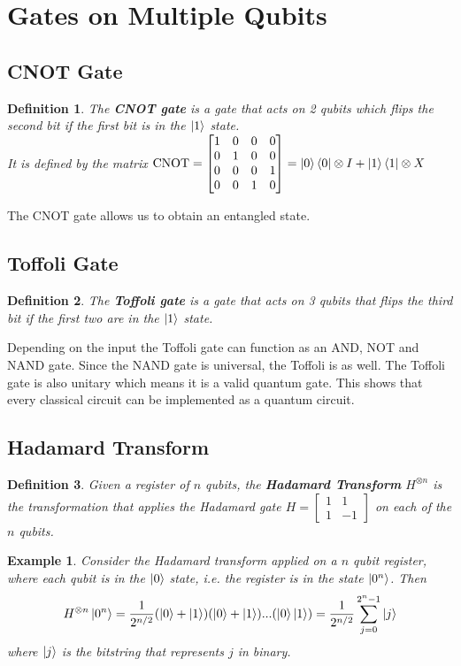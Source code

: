 \documentclass[12pt,twoside,fleqn]{report}
\theoremstyle{thmstyle}
\newtheorem{defn}{Definition}[chapter]
\newtheorem{eg}{Example}[chapter]
\begin{document}
\section{Gates on Multiple Qubits}

\subsection{CNOT Gate}
\begin{defn}
    The \textbf{CNOT gate} is a gate that acts on 2 qubits which flips the second bit if the first bit is in the $\ket{1}$ state.\\
    It is defined by the matrix $\text{CNOT} = \begin{bmatrix} 1 & 0 & 0 & 0 \\ 0 & 1 & 0 & 0 \\ 0 & 0 & 0 & 1 \\ 0 & 0 & 1 & 0 \end{bmatrix} = \ket{0}\bra{0} \otimes I + \ket{1}\bra{1} \otimes X$
\end{defn}
The CNOT gate allows us to obtain an entangled state.

\subsection{Toffoli Gate}
\begin{defn}
    The \textbf{Toffoli gate} is a gate that acts on 3 qubits that flips the third bit if the first two are in the $\ket{1}$ state.\\
\end{defn}

Depending on the input the Toffoli gate can function as an AND, NOT and NAND gate. Since the NAND gate is universal, the Toffoli is as well. The Toffoli gate is also unitary which means it is a valid quantum gate. This shows that every classical circuit can be implemented as a quantum circuit.

\subsection{Hadamard Transform}
\begin{defn}
    Given a register of $n$ qubits, the \textbf{Hadamard Transform} $H^{\otimes n}$ is the transformation that applies the Hadamard gate $H = \begin{bmatrix} 1 & 1 \\ 1 & -1 \end{bmatrix}$ on each of the $n$ qubits.
\end{defn}
\begin{eg}
    Consider the Hadamard transform applied on a $n$ qubit register, where each qubit is in the $\ket{0}$ state, i.e. the register is in the state $\ket{0^n}$.
    Then \[ H^{\otimes n} \ket{0^n} = \frac{1}{2^{n/2}} (\ket{0} + \ket{1})(\ket{0} + \ket{1})...(\ket{0} \ket{1}) = \frac{1}{2^{n/2}} \sum_{j=0}^{2^n-1} \ket{j} \] where $\ket{j}$ is the bitstring that represents $j$ in binary.
\end{eg}
\end{document}
